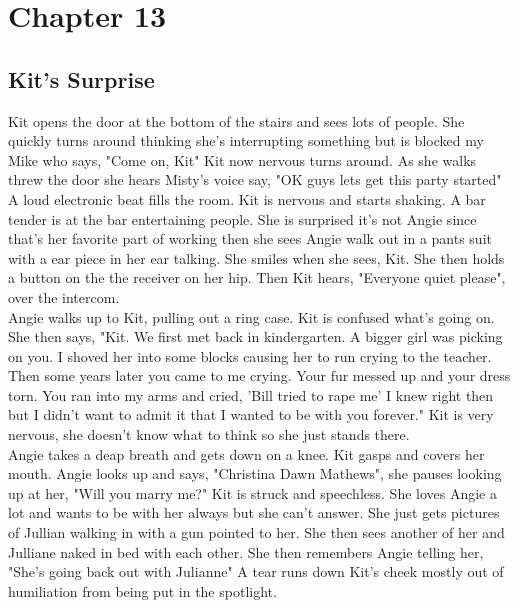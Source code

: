 \documentclass{article}[12px]
\begin{document}
\section* {Chapter 13}
\subsection* {Kit's Surprise}
    Kit opens the door at the bottom of the stairs and sees lots of people. She quickly turns around thinking she's interrupting something but is blocked my Mike who says, "Come on, Kit" Kit now nervous turns around. As she walks threw the door she hears Misty's voice say, "OK guys lets get this party started" A loud electronic beat fills the room. Kit is nervous and starts shaking. A bar tender is at the bar entertaining people. She is surprised it's not Angie since that's her favorite part of working then she sees Angie walk out in a pants suit with a ear piece in her ear talking. She smiles when she sees, Kit. She then holds a button on the the receiver on her hip. Then Kit hears, "Everyone quiet please", over the intercom. \\

    Angie walks up to Kit, pulling out a ring case. Kit is confused what's going on. She then says, "Kit. We first met back in kindergarten. A bigger girl was picking on you. I shoved her into some blocks causing her to run crying to the teacher. Then some years later you came to me crying. Your fur messed up and your dress torn. You ran into my arms and cried, 'Bill tried to rape me' I knew right then but I didn't want to admit it that I wanted to be with you forever." Kit is very nervous, she doesn't know what to think so she just stands there.\\

    Angie takes a deap breath and gets down on a knee. Kit gasps and covers her mouth. Angie looks up and says, "Christina Dawn Mathews", she pauses looking up at her, "Will you marry me?" Kit is struck and speechless. She loves Angie a lot and wants to be with her always but she can't answer. She just gets pictures of Jullian walking in with a gun pointed to her. She then sees another of her and Julliane naked in bed with each other. She then remembers Angie telling her, "She's going back out with Julianne" A tear runs down Kit's cheek mostly out of humiliation from being put in the spotlight.\\
\end{document}
